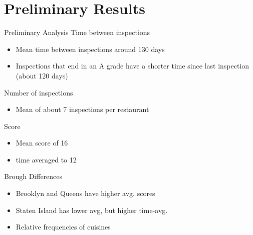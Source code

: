 \documentclass[12pt]{beamer}
\begin{document}
\section{Preliminary Results}
\begin{frame}{Preliminary Analysis}
\vfill
Time between inspections
\begin{itemize}
	\item Mean time between inspections around 130 days
	\item Inspections that end in an A grade have a shorter time since 
	last inspection (about 120 days)
\end{itemize}
\vfill
Number of inspections
\begin{itemize}
	\item Mean of about 7 inspections per restaurant
\end{itemize}
\vfill
Score
\begin{itemize}
	\item Mean score of 16
	\item time averaged to 12
\end{itemize}
\vfill
\end{frame}

\begin{frame}{Brough Differences}
\vfill
\begin{itemize}
	\item Brooklyn and Queens have higher avg. scores
	\vfill
	\item Staten Island has lower avg, but higher time-avg.
	\vfill
	\item Relative frequencies of cuisines
\end{itemize}
\vfill
\end{frame}
\end{document}
